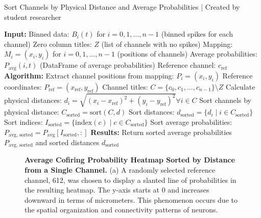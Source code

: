 \documentclass{article} %
\begin{document}
\begin{singlespace}
    \begin{algorithm}
    \caption{Sort Channels by Physical Distance and Average Probabilities | Created by student researcher}
        \begin{algorithmic}[1]
            \State \textbf{Input:}
            \State  Binned data: $B_{i}(t)$ for $i = 0, 1, \ldots, n-1$ (binned spikes for each channel)
            \State  Zero column titles: $Z$ (list of channels with no spikes)
            \State  Mapping: $M_{i} = (x_{i}, y_{i})$ for $i = 0, 1, \ldots, n-1$ (positions of channels)
            \State  Average probabilities: $P_{\text{avg}}(i, t)$ (DataFrame of average probabilities)
            \State  Reference channel: $c_{\text{ref}}$
            \State
            \State \textbf{Algorithm:}
            \State  Extract channel positions from mapping: $P_{i} = (x_{i}, y_{i})$
            \State  Reference coordinates: $P_{\text{ref}} = (x_{\text{ref}}, y_{\text{ref}})$
            \State  Channel titles: $C = \{c_{0}, c_{1}, \ldots, c_{n-1}\} \setminus Z$
            \State  Calculate physical distances: $d_{i} = \sqrt{(x_{i} - x_{\text{ref}})^2 + (y_{i} - y_{\text{ref}})^2}  \forall i \in C$
            \State  Sort channels by physical distance: $C_{\text{sorted}} = \text{sort}(C, d)$
            \State  Sort distances: $d_{\text{sorted}} = \{d_{i} \mid i \in C_{\text{sorted}}\}$
            \State  Sort indices: $I_{\text{sorted}} = \{\text{index}(c) \mid c \in C_{\text{sorted}}\}$
            \State  Sort average probabilities: $P_{\text{avg, sorted}} = P_{\text{avg}}[I_{\text{sorted}}, :]$
            \State
            \State \textbf{Results:}
            \State  Return sorted average probabilities $P_{\text{avg, sorted}}$ and sorted distances $d_{\text{sorted}}$
        \end{algorithmic}
    \end{algorithm}
\end{singlespace}


\begin{figure}
    \centering
    \caption{\textbf{Average Cofiring Probability Heatmap Sorted by Distance from a Single Channel.} (a) A randomly selected reference channel, 612, was chosen to display a slanted line of probabilities in the resulting heatmap. The y-axis starts at 0 and increases downward in terms of micrometers. This phenomenon occurs due to the spatial organization and connectivity patterns of neurons.}
\end{figure}
\end{document}
